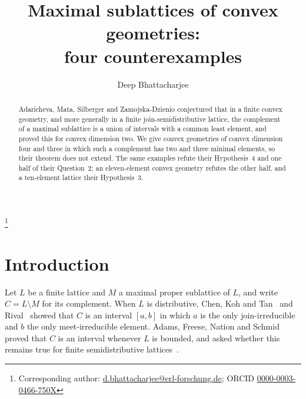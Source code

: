 \documentclass[11pt]{amsart}
\theoremstyle{definition}
\theoremstyle{remark}
\numberwithin{equation}{section}
\begin{document}
\title[Maximal sublattices of convex geometries]{Maximal sublattices of convex geometries:\\ four counterexamples}

\author{Deep Bhattacharjee}
\address{Formerly, Electro-Gravitational Space Propulsion Laboratory (EGSPL),\newline Bhubaneswar, Odisha 751030, India}
\thanks{Corresponding author: \href{mailto:d.bhattacharjee@erl-forschung.de}{d.bhattacharjee@erl-forschung.de}; ORCID \href{https://orcid.org/0000-0003-0466-750X}{\mbox{0000-0003-0466-750X}}}


\begin{abstract}
Adaricheva, Mata, Silberger and Zamojska-Dzienio conjectured that in a finite convex geometry, and more generally in a finite join-semidistributive lattice, the complement of a maximal sublattice is a union of intervals with a common least element, and proved this for convex dimension two. We give convex geometries of convex dimension four and three in which such a complement has two and three minimal elements, so their theorem does not extend. The same examples refute their Hypothesis~4 and one half of their Question~2; an eleven-element convex geometry refutes the other half, and a ten-element lattice their Hypothesis~3.
\end{abstract}

\maketitle

\section{Introduction}

Let $L$ be a finite lattice and $M$ a maximal proper sublattice of $L$, and write $C=L\setminus M$ for its complement. When $L$ is distributive, Chen, Koh and Tan~\cite[Theorem~4]{CKT} and Rival~\cite[Theorem~3]{Ri} showed that $C$ is an interval $[a,b]$ in which $a$ is the only join-irreducible and $b$ the only meet-irreducible element. Adams, Freese, Nation and Schmid~\cite[Theorem~7]{AFNS} proved that $C$ is an interval whenever $L$ is bounded, and asked whether this remains true for finite semidistributive lattices~\cite[p.~7]{AFNS}.
\end{document}
